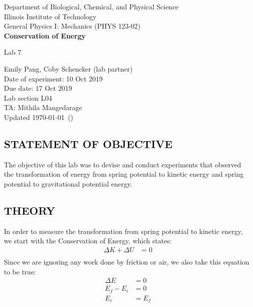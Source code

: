 \documentclass [12pt, letterpaper, twoside] {article}
\begin{document}
\begin {titlepage}
\begin {center}
Department of Biological, Chemical, and Physical Science\\
\vspace {0.1cm}
Illinois Institute of Technology\\
\vspace {0.1cm}
General Physics I: Mechanics (PHYS 123-02)\\
\vspace* {\fill}
\begingroup
\Large
\textbf {Conservation of Energy}
\vspace {0.35cm}

\normalsize
Lab 7
\vspace {1.5cm}
\endgroup
\vspace* {\fill}
\end {center}

\vspace*{\fill}
\begin {flushright}
\footnotesize
Emily Pang, Coby Schencker (lab partner)\\
Date of experiment: 10 Oct 2019\\
Due date: 17 Oct 2019\\
Lab section L04\\
TA: Mithila Mangedarage\\
Updated \usdate\today~(\currenttime)
\end {flushright}
\end {titlepage}
\pgfplotsset{compat=1.7}
\subsection* {STATEMENT OF OBJECTIVE}
The objective of this lab was to devise and conduct experiments that observed the transformation of energy from spring potential to kinetic energy and spring potential to gravitational potential energy.

\subsection* {THEORY}
\noindent
In order to measure the transformation from spring potential to kinetic energy, we start with the Conservation of Energy, which states:
\begin {equation}
  \begin {split}
    \Delta{K} + \Delta{U} & = 0 \\
  \end {split}
\end {equation}
Since we are ignoring any work done by friction or air, we also take this equation to be true:
\begin {equation}
  \begin {split}
    \Delta{E} & = 0 \\
    E_{f} - E_{i} & = 0 \\
    E_{i} & = E_{f} \\
  \end {split}
\end {equation}
\end{document}
